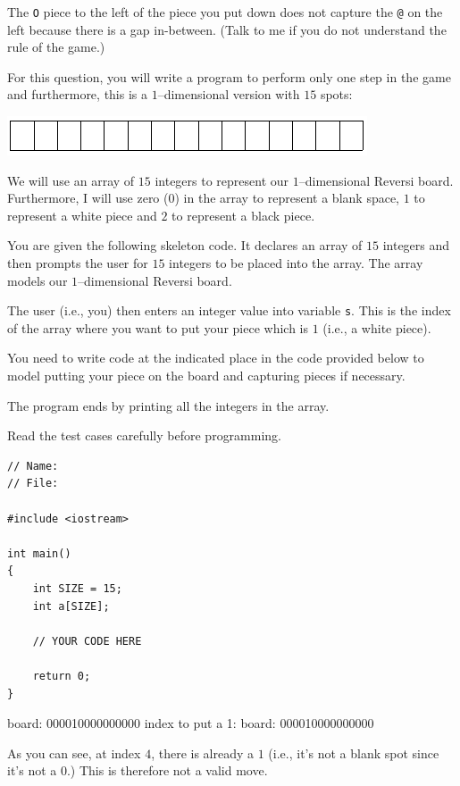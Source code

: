 The \verb!O! piece to the left of the piece you put down does not capture the
\verb!@! on the left because there is a gap in-between.
(Talk to me if you do not understand the rule of the game.)

For this question, you will write a program to perform only one step in the
game and furthermore, this is a $1$--dimensional version with $15$ spots:

\includegraphics[scale=0.5]{pic8.png}

We will use an array of $15$ integers to represent our $1$--dimensional Reversi
board. Furthermore, I will use zero ($0$) in the array to represent a blank
space, $1$ to represent a white piece and $2$ to represent a black piece.

You are given the following skeleton code. It declares an array of $15$
integers and then prompts the user for $15$ integers to be placed into the
array. The array models our $1$--dimensional Reversi board.

The user (i.e., you) then enters an integer value into variable \verb!s!. This
is the index of the array where you want to put your piece which is $1$ (i.e.,
a white piece).

You need to write code at the indicated place in the code provided below to model
putting your piece on the board and capturing pieces if necessary.

The program ends by printing all the integers in the array.

Read the test cases carefully before programming.

\begin{Verbatim}[frame=single]
// Name:
// File:

#include <iostream>

int main()
{
    int SIZE = 15;
    int a[SIZE];

    // YOUR CODE HERE

    return 0;
}
\end{Verbatim}


\resett
\nextt
\begin{console}[frame=single, commandchars=\\\{\}]
board: 000010000000000
index to put a 1: 
board: 000010000000000
\end{console}
As you can see, at index $4$, there is already a $1$ (i.e., it's not a blank
spot since it's not a $0$.) This is therefore not a valid move.


